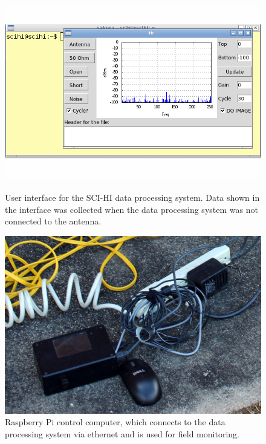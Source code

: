 \begin{figure}[htb]
\centering
\begin{minipage}[b]{0.53\textwidth}
\centering
\includegraphics[width=0.85\linewidth]{SCIHI_system/figures/SCIHI_UI_Screen.jpg}
\caption{User interface for the SCI-HI data processing system. Data shown in the interface was collected when the data processing system was not connected to the antenna. }
\label{Fig:GUI}
\end{minipage}%
\begin{minipage}[b]{0.02\textwidth}
\hspace{1cm}
\end{minipage}%
\begin{minipage}[b]{0.45\textwidth}
\centering
\includegraphics[width=0.95\linewidth]{SCIHI_system/figures/SCIHI_raspberry_pi.jpg}
\caption{Raspberry Pi control computer, which connects to the data processing system via ethernet and is used for field monitoring. }
\label{Fig:raspberry_pi}

\end{minipage}
\end{figure}



